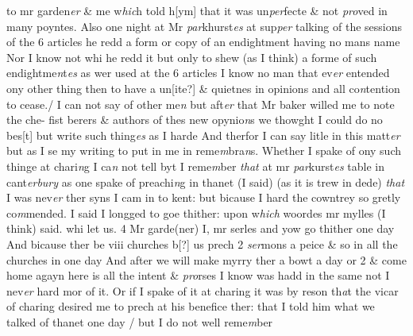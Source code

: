\documentclass[12pt, a4paper]{book}
\begin{document}
			 to mr garden\textit{er} \& me w\textit{hic}h told h[ym] 
				\marginpar[\vspace{0.5cm}{\textcolor{Gray}{10}}]{}
			 that it was un\textit{per}fecte \& not \textit{pro}ved in many poyntes. Also one night at Mr \textit{par}khurst\textit{es} at sup\textit{per} talking of the sessions of the 6 articles he redd a form or copy of an endightment having no mans name Nor I know not whi he redd it but only to shew (as I think) a forme of such endightme\textit{n}t\textit{es} as wer used at the 6 articles 
				\marginpar[\vspace{0.5cm}{\textcolor{Gray}{11.}}]{}
			 I know no man that ev\textit{er} entended ony other thing then to have a un[ite?]  \& quietnes in opinions and all co\textit{n}tention to cease./ 
				\marginpar[\vspace{0.5cm}{\textcolor{Gray}{12.}}]{}
			 I can not say of other me\textit{n} but aft\textit{er} that Mr baker willed me to note the che- fist berers \& authors of thes new opynio\textit{n}s we thowght I could do no bes[t] but write such thing\textit{es} as I harde And therfor I can say litle in this  matt\textit{er} but as I se my writing to put in me in reme\textit{m}bra\textit{n}s.  Whether I spake of ony such thinge at chari\textit{n}g I ca\textit{n}
               not 
			tell byt I reme\textit{m}ber \textit{that} 
				\marginpar[\vspace{0.5cm}{\textcolor{Gray}{n}}]{}
			 at mr \textit{par}kurst\textit{es} table in cant\textit{erbury} as one spake of preachi\textit{n}g in thanet (I said)  (as it is trew in dede) \textit{that} I was nev\textit{er} ther syns I cam in to kent: but  bicause I hard the cowntrey so gretly co\textit{m}mended. I said I longged to goe thither: upon w\textit{hich} woordes mr mylles (I think) said. whi let us. 4 Mr garde(ner) I, mr serles and yow go thither one day And bicause ther be viii churches b[?] us prech 2 \textit{ser}mons a peice \& so in all the churches in one day And after we will make myrry ther a bowt a day or 2 \& come home agayn here is all the intent \& \textit{pro}rses I know was hadd in the same not I nev\textit{er} hard mor of it. Or if I spake of it at charing it was by reson th\textit{a}t the  vicar of charing desired me to prech at his benefice ther: that I told him what we talked of thanet one day / but I do not well reme\textit{m}ber

\dotfill
					
\end{document}
